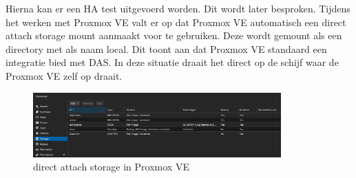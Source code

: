 Hierna kan er een HA test uitgevoerd worden. Dit wordt later besproken.
Tijdens het werken met Proxmox VE valt er op dat Proxmox VE automatisch een direct attach storage mount aanmaakt voor te gebruiken. Deze wordt gemount als een directory met als naam local.
Dit toont aan dat Proxmox VE standaard een integratie bied met DAS. In deze situatie draait het direct op de schijf waar de Proxmox VE zelf op draait.
\begin{figure}[H]
  \centering
  \includegraphics[width=0.85\textwidth]{../poc/das-proxmox.png}
  \caption{direct attach storage in Proxmox VE}
  \label{fig:das-prox}
\end{figure}



